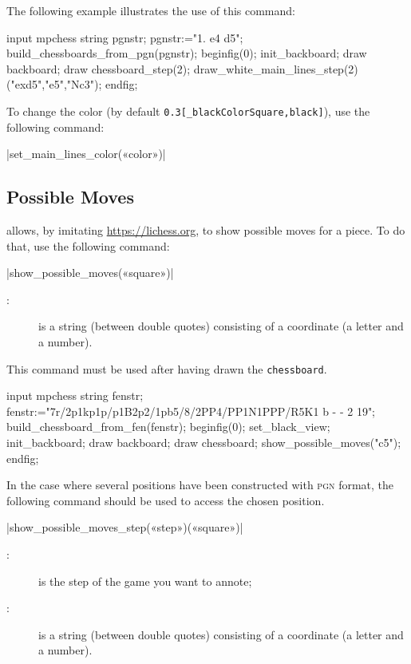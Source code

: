 \documentclass[english]{ltxdoc}
\begin{document}
The following example illustrates the use of this command:
\begin{ExempleMP}
input mpchess
string pgnstr;
pgnstr:="1. e4 d5";
build_chessboards_from_pgn(pgnstr);
beginfig(0);
init_backboard;
draw backboard;
draw chessboard_step(2);
draw_white_main_lines_step(2)("exd5","e5","Nc3");
endfig;
\end{ExempleMP}

To change the color (by default \lstinline+0.3[_blackColorSquare,black]+),
 use the following command:

\commande|set_main_lines_color(«color»)|\smallskip


\subsection{Possible Moves}\label{sec:possiblemoves}

\mpchess allows, by imitating \href{Lichess.org}{https://lichess.org},
to show possible moves for a piece. To do that, use the following command:

\commande|show_possible_moves(«square»)|\smallskip

\begin{description}
\item[:] is a string (between double quotes) consisting
of a coordinate (a letter and a number). 
\end{description}

This command must be used after having drawn the  \lstinline+chessboard+.

\begin{ExempleMP}
  input mpchess
  string fenstr;
  fenstr:="7r/2p1kp1p/p1B2p2/1pb5/8/2PP4/PP1N1PPP/R5K1 b - - 2 19";
  build_chessboard_from_fen(fenstr);
  beginfig(0);
  set_black_view;
  init_backboard;
  draw backboard;
  draw chessboard;
  show_possible_moves("c5");
  endfig;
\end{ExempleMP}  

In the case where several positions have been constructed with \textsc{pgn}
format, the following command should be used to access the chosen position. 

\commande|show_possible_moves_step(«step»)(«square»)|\smallskip

\begin{description}
  \item[:] is the step of the game you want to annote;
  \item[:] is a string (between double quotes) consisting
of a coordinate (a letter and a number).
\end{description}
\end{document}
